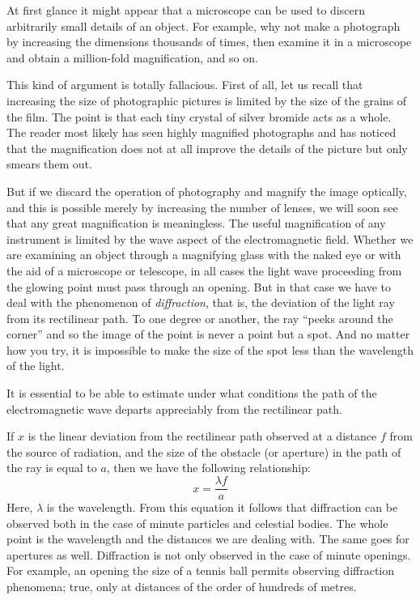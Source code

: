 At first glance it might appear that a microscope can be used to discern arbitrarily small details of an object. For example, why not make a photograph by increasing the dimensions thousands of times, then examine it in a microscope and obtain a million-fold magnification, and so on.

This kind of argument is totally fallacious. First of all, let us recall that increasing the size of photographic pictures is limited by the size of the grains of the film. The point is that each tiny crystal of silver bromide acts as a whole. The reader most likely has seen highly mag­nified photographs and has noticed that the magnifica­tion does not at all improve the details of the picture but only smears them out.

But if we discard the operation of photography and magnify the image optically, and this is possible merely by increasing the number of lenses, we will soon see that any great magnification is meaningless. The useful mag­nification of any instrument is limited by the wave aspect of the electromagnetic field. Whether we are examining an object through a magnifying glass with the naked eye or with the aid of a microscope or telescope, in all cases the light wave proceeding from the glowing point must pass through an opening. But in that case we have to deal with the phenomenon of \emph{diffraction},\label{diff-ref} that is, the deviation of the light ray from its rectilinear path. To one degree or another, the ray ``peeks around the corner'' and so the image of the point is never a point but a spot. And no matter how you try, it is impossible to make the size of the spot less than the wavelength of the light.

It is essential to be able to estimate under what condi­tions the path of the electromagnetic wave departs appre­ciably from the rectilinear path.

If $x$ is the linear deviation from the rectilinear path observed at a distance $f$ from the source of radiation, and the size of the obstacle (or aperture) in the path of the ray is equal to $a$, then we have the following rela­tionship:
\begin{equation*}%
x = \frac{\lambda f}{a}
\end{equation*}
Here, $\lambda$ is the wavelength. From this equation it follows that diffraction can be observed both in the case of mi­nute particles and celestial bodies. The whole point is the wavelength and the distances we are dealing with. The same goes for apertures as well. Diffraction is not only observed in the case of minute openings. For exam­ple, an opening the size of a tennis ball permits observing diffraction phenomena; true, only at distances of the order of hundreds of metres.

